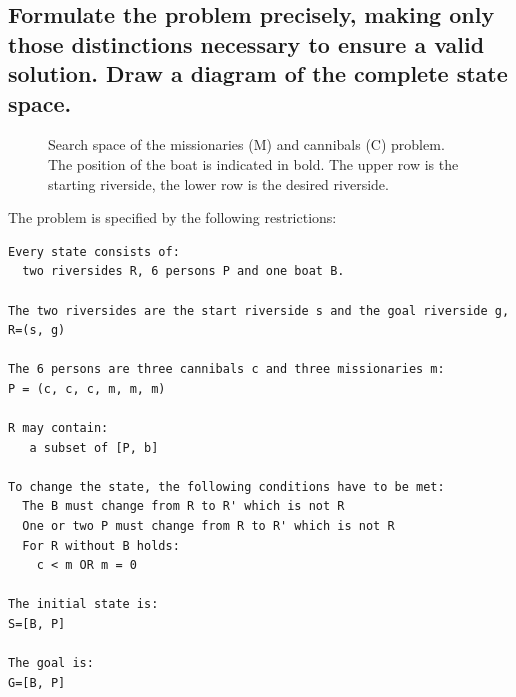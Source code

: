 \documentclass{scrreprt}
\begin{document}
\subsection*{Formulate the problem precisely, making only those distinctions necessary to ensure a valid
solution. Draw a diagram of the complete state space.}
\begin{figure}[hp]
  \centering
  \caption*{Search space of the missionaries (M) and cannibals (C) problem. The position of the boat is indicated in bold. The upper row is the starting riverside, the lower row is the desired riverside.}
  \label{}
\end{figure}
The problem is specified by the following restrictions:\\
\begin{lstlisting}
Every state consists of:
  two riversides R, 6 persons P and one boat B.

The two riversides are the start riverside s and the goal riverside g,   
R=(s, g)

The 6 persons are three cannibals c and three missionaries m:
P = (c, c, c, m, m, m)

R may contain:
   a subset of [P, b]

To change the state, the following conditions have to be met:
  The B must change from R to R' which is not R
  One or two P must change from R to R' which is not R
  For R without B holds:
    c < m OR m = 0

The initial state is:
S=[B, P]

The goal is:
G=[B, P] 
\end{lstlisting}  
\end{document}
